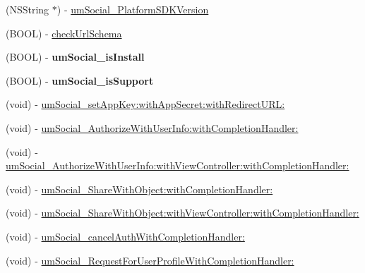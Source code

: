 \begin{DoxyCompactItemize}
\item 
(N\+S\+String $\ast$) -\/ \mbox{\hyperlink{protocol_u_m_social_platform_provider_01-p_a03a01c52bd5f6689bf20c35760a4460b}{um\+Social\+\_\+\+Platform\+S\+D\+K\+Version}}
\item 
(B\+O\+OL) -\/ \mbox{\hyperlink{protocol_u_m_social_platform_provider_01-p_ac3636541b3af7e39f583e8766613b11c}{check\+Url\+Schema}}
\item 
\mbox{\label{protocol_u_m_social_platform_provider_01-p_a86b82bfde78b6b28009259a497d331de}} 
(B\+O\+OL) -\/ {\bfseries um\+Social\+\_\+is\+Install}
\item 
\mbox{\label{protocol_u_m_social_platform_provider_01-p_a16050bc0dcf6823beea2ace63eb64052}} 
(B\+O\+OL) -\/ {\bfseries um\+Social\+\_\+is\+Support}
\item 
(void) -\/ \mbox{\hyperlink{protocol_u_m_social_platform_provider_01-p_a4591a33b9f6de5ff2a688fbb82e42d6b}{um\+Social\+\_\+set\+App\+Key\+:with\+App\+Secret\+:with\+Redirect\+U\+R\+L\+:}}
\item 
(void) -\/ \mbox{\hyperlink{protocol_u_m_social_platform_provider_01-p_ae1ebabde25fa467a8dbd3360c69f1cae}{um\+Social\+\_\+\+Authorize\+With\+User\+Info\+:with\+Completion\+Handler\+:}}
\item 
(void) -\/ \mbox{\hyperlink{protocol_u_m_social_platform_provider_01-p_a99c9538562ad13c437698eadbd8fe7c6}{um\+Social\+\_\+\+Authorize\+With\+User\+Info\+:with\+View\+Controller\+:with\+Completion\+Handler\+:}}
\item 
(void) -\/ \mbox{\hyperlink{protocol_u_m_social_platform_provider_01-p_a23c57a8e07c351874d8b2bff217c3fd7}{um\+Social\+\_\+\+Share\+With\+Object\+:with\+Completion\+Handler\+:}}
\item 
(void) -\/ \mbox{\hyperlink{protocol_u_m_social_platform_provider_01-p_aaee3cd0e221b820d92575edbbf198c52}{um\+Social\+\_\+\+Share\+With\+Object\+:with\+View\+Controller\+:with\+Completion\+Handler\+:}}
\item 
(void) -\/ \mbox{\hyperlink{protocol_u_m_social_platform_provider_01-p_acd16d08a46fd30b401adca83262cc586}{um\+Social\+\_\+cancel\+Auth\+With\+Completion\+Handler\+:}}
\item 
(void) -\/ \mbox{\hyperlink{protocol_u_m_social_platform_provider_01-p_a1d888890a07689a660523c8e9cb614d9}{um\+Social\+\_\+\+Request\+For\+User\+Profile\+With\+Completion\+Handler\+:}}

\end{DoxyCompactItemize}
